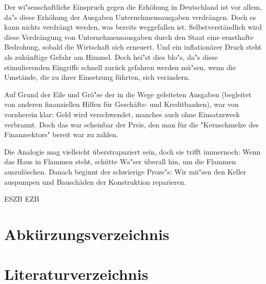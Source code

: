 \documentclass[
        onecolumn,
        a4paper,
        abstracton,
        parskip=half
        ,final
        ]{scrartcl}
\begin{document}
Der wi{"s}enschaftliche Einspruch gegen die Erh{\"o}hung in Deutschland ist vor allem, da{"s} diese Erh{\"o}hung der Ausgaben Unternehmensausgaben verdr{\"a}ngen. Doch es kann nichts verdr{\"a}ngt werden, was bereits weggefallen ist. Selbstverst{\"a}ndlich wird diese Verdr{\"a}ngung von Unternehmensausgaben durch den Staat eine ernsthafte Bedrohung, sobald die Wirtschaft sich erneuert. Und ein inflation{\"a}rer Druck steht als zuk{\"u}nftige Gefahr am Himmel. Doch hei{"s}t dies blo{"s}, da{"s} diese stimulierenden Eingriffe schnell zur{\"u}ck gefahren werden m{\"u}{"s}en, wenn die Umst{\"a}nde, die zu ihrer Einsetzung f{\"u}hrten, sich ver{\"a}ndern.

Auf Grund der Eile und Gr{\"o}{"s}e der in die Wege geleiteten Ausgaben (begleitet von anderen finanziellen Hilfen f{\"u}r Gesch{\"a}fts- und Kreditbanken), war von vornherein klar: Geld wird verschwendet, manches auch ohne Einsatzzweck verbrannt. Doch das war scheinbar der Preis, den man f{\"u}r die "Kernschmelze des Finanzsektors" bereit war zu zahlen.

Die Analogie mag vielleicht {\"u}berstrapaziert sein, doch sie trifft immernoch: Wenn das Haus in Flammen steht, sch{\"u}tte Wa{"s}er {\"u}berall hin, um die Flammen auszul{\"o}schen. Danach beginnt der schwierige Proze{"s}: Wir m{\"u}{"s}en den Keller auspumpen und Bausch{\"a}den der Konstruktion reparieren.


\clearpage
\ac{ESZB}
\ac{EZB}

\clearpage

\section{Abk{\"u}rzungsverzeichnis}
	\label{sec5:Abkuerzungsverzeichnis}

\begin{acronym}[ESZB]



\end{acronym}

\vspace{10pt}
	\newpage
  	\singlespacing



\section{Literaturverzeichnis}
	\label{sec6:Literaturverzeichnis}
	\newpage





\end{document}
